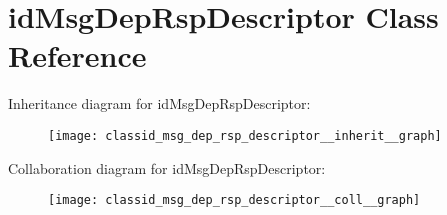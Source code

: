 \hypertarget{classid_msg_dep_rsp_descriptor}{}\section{id\+Msg\+Dep\+Rsp\+Descriptor Class Reference}
\label{classid_msg_dep_rsp_descriptor}


Inheritance diagram for id\+Msg\+Dep\+Rsp\+Descriptor\+:
\nopagebreak
\begin{figure}[H]
\begin{center}
\leavevmode
\texttt{[image: classid\_msg\_dep\_rsp\_descriptor\_\_inherit\_\_graph]}
\end{center}
\end{figure}


Collaboration diagram for id\+Msg\+Dep\+Rsp\+Descriptor\+:
\nopagebreak
\begin{figure}[H]
\begin{center}
\leavevmode
\texttt{[image: classid\_msg\_dep\_rsp\_descriptor\_\_coll\_\_graph]}
\end{center}
\end{figure}
